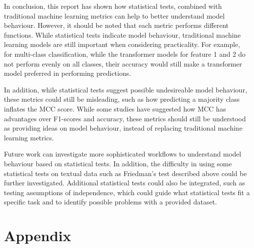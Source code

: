 \documentclass[10.7pt, onecolumn]{article}
\begin{document}
In conclusion, this report has shown how statistical tests, combined with traditional machine learning metrics can help to better understand model behaviour. However, it should be noted that each metric performs different functions. While statistical tests indicate model behaviour, traditional machine learning models are still important when considering practicality. For example, for multi-class classification, while the transformer models for feature 1 and 2 do not perform evenly on all classes, their accuracy would still make a transformer model preferred in performing predictions. 

In addition, while statistical tests suggest possible undesireable model behaviour, these metrics could still be misleading, such as how predicting a majority class inflates the MCC score. While some studies have suggested how MCC has advantages over F1-scores and accuracy\cite{articlesss}, these metrics should still be understood as providing ideas on model behaviour, instead of replacing traditional machine learning metrics.

Future work can investigate more sophisticated workflows to understand model behaviour based on statistical tests. In addition, the difficulty in using some statistical tests on textual data such as Friedman's test described above could be further investigated. Additional statistical tests could also be integrated, such as testing assumptions of independence, which could guide what statistical tests fit a specific task and to identify possible problems with a provided dataset\cite{article2}.



\newpage



\section{Appendix}
\end{document}
